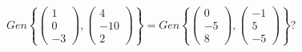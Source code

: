 \documentclass{article}
\begin{document}
\begin{enumerate}
        \(
            Gen
            \left\{
                \begin{pmatrix}
                    1 \\ 0 \\ -3
                \end{pmatrix},
                \begin{pmatrix}
                    4 \\ -10 \\ 2
                \end{pmatrix}
            \right\}
            =
            Gen
            \left\{
                \begin{pmatrix}
                    0 \\ -5 \\ 8
                \end{pmatrix},
                \begin{pmatrix}
                    -1 \\ 5 \\ -5
                \end{pmatrix}
            \right\}
        \)?
\end{enumerate}
\end{document}
